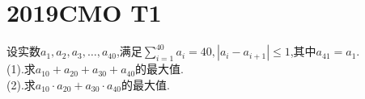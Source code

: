 \documentclass[]{article}
\title{}
\author{}
\date{}
\begin{document}
\maketitle
\section{2019CMO T1}{
设实数$a_1,a_2,a_3,…,a_{40}$,满足$\sum\limits_{i=1}^{40}a_i=40,\left| a_i-a_{i+1} \right|\leq 1$,其中$a_{41}=a_1$.\\
(1).求$a_{10}+a_{20}+a_{30}+a_{40}$的最大值.\\
(2).求$a_{10}·a_{20}+a_{30}·a_{40}$的最大值.
}
\end{document}
